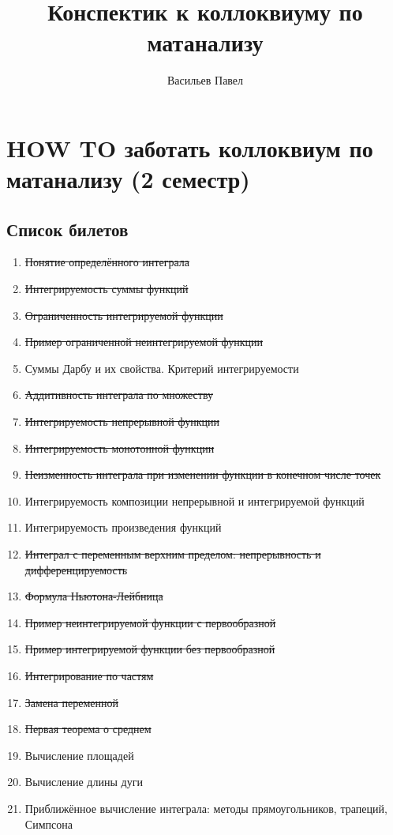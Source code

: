 \documentclass[a4paper]{article}
\title{Конспектик к коллоквиуму по матанализу}
\author{Васильев Павел}
\begin{document}
\section*{HOW TO заботать коллоквиум по матанализу (2 семестр)}


\subsection*{Список билетов}
\begin{enumerate}
\item \sout{Понятие определённого интеграла}
\item \sout{Интегрируемость суммы функций}
\item \sout{Ограниченность интегрируемой функции}
\item \sout{Пример ограниченной неинтегрируемой функции}
\item Суммы Дарбу и их свойства. Критерий интегрируемости
\item \sout{Аддитивность интеграла по множеству}
\item \sout{Интегрируемость непрерывной функции}
\item \sout{Интегрируемость монотонной функции}
\item \sout{Неизменность интеграла при изменении функции в конечном числе точек}
\item Интегрируемость композиции непрерывной и интегрируемой функций
\item Интегрируемость произведения функций
\item \sout{Интеграл с переменным верхним пределом: непрерывность и дифференцируемость}
\item \sout{Формула Ньютона-Лейбница}
\item \sout{Пример неинтегрируемой функции с первообразной}
\item \sout{Пример интегрируемой функции без первообразной}
\item \sout{Интегрирование по частям}
\item \sout{Замена переменной}
\item \sout{Первая теорема о среднем}
\item Вычисление площадей
\item Вычисление длины дуги
\item Приближённое вычисление интеграла: методы прямоугольников, трапеций, Симпсона 
\end{enumerate}

\newpage
\end{document}
